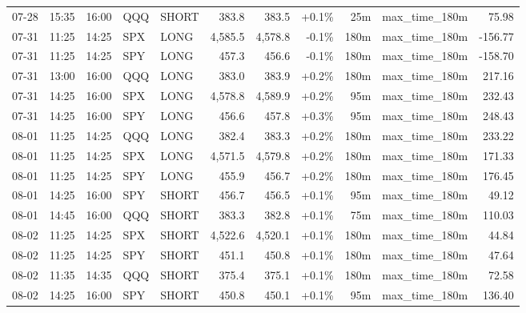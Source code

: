\documentclass[11pt,a4paper,twoside]{article}
\begin{document}
\begin{center}
\begin{longtable}{>{\color{txtmain}}l l l l l r r r r >{\color{txtmain}}l r}
07-28 & 15:35 & 16:00 & QQQ & SHORT & 383.8 & 383.5 & \textcolor{wingreen}{+0.1\%} & 25m & max\_time\_180m & \textcolor{wingreen}{75.98} \\
07-31 & 11:25 & 14:25 & SPX & LONG & 4,585.5 & 4,578.8 & \textcolor{lossred}{-0.1\%} & 180m & max\_time\_180m & \textcolor{lossred}{-156.77} \\
07-31 & 11:25 & 14:25 & SPY & LONG & 457.3 & 456.6 & \textcolor{lossred}{-0.1\%} & 180m & max\_time\_180m & \textcolor{lossred}{-158.70} \\
07-31 & 13:00 & 16:00 & QQQ & LONG & 383.0 & 383.9 & \textcolor{wingreen}{+0.2\%} & 180m & max\_time\_180m & \textcolor{wingreen}{217.16} \\
07-31 & 14:25 & 16:00 & SPX & LONG & 4,578.8 & 4,589.9 & \textcolor{wingreen}{+0.2\%} & 95m & max\_time\_180m & \textcolor{wingreen}{232.43} \\
07-31 & 14:25 & 16:00 & SPY & LONG & 456.6 & 457.8 & \textcolor{wingreen}{+0.3\%} & 95m & max\_time\_180m & \textcolor{wingreen}{248.43} \\
08-01 & 11:25 & 14:25 & QQQ & LONG & 382.4 & 383.3 & \textcolor{wingreen}{+0.2\%} & 180m & max\_time\_180m & \textcolor{wingreen}{233.22} \\
08-01 & 11:25 & 14:25 & SPX & LONG & 4,571.5 & 4,579.8 & \textcolor{wingreen}{+0.2\%} & 180m & max\_time\_180m & \textcolor{wingreen}{171.33} \\
08-01 & 11:25 & 14:25 & SPY & LONG & 455.9 & 456.7 & \textcolor{wingreen}{+0.2\%} & 180m & max\_time\_180m & \textcolor{wingreen}{176.45} \\
08-01 & 14:25 & 16:00 & SPY & SHORT & 456.7 & 456.5 & \textcolor{wingreen}{+0.1\%} & 95m & max\_time\_180m & \textcolor{wingreen}{49.12} \\
08-01 & 14:45 & 16:00 & QQQ & SHORT & 383.3 & 382.8 & \textcolor{wingreen}{+0.1\%} & 75m & max\_time\_180m & \textcolor{wingreen}{110.03} \\
08-02 & 11:25 & 14:25 & SPX & SHORT & 4,522.6 & 4,520.1 & \textcolor{wingreen}{+0.1\%} & 180m & max\_time\_180m & \textcolor{wingreen}{44.84} \\
08-02 & 11:25 & 14:25 & SPY & SHORT & 451.1 & 450.8 & \textcolor{wingreen}{+0.1\%} & 180m & max\_time\_180m & \textcolor{wingreen}{47.64} \\
08-02 & 11:35 & 14:35 & QQQ & SHORT & 375.4 & 375.1 & \textcolor{wingreen}{+0.1\%} & 180m & max\_time\_180m & \textcolor{wingreen}{72.58} \\
08-02 & 14:25 & 16:00 & SPY & SHORT & 450.8 & 450.1 & \textcolor{wingreen}{+0.1\%} & 95m & max\_time\_180m & \textcolor{wingreen}{136.40} \\

\end{longtable}
\end{center}
\end{document}
